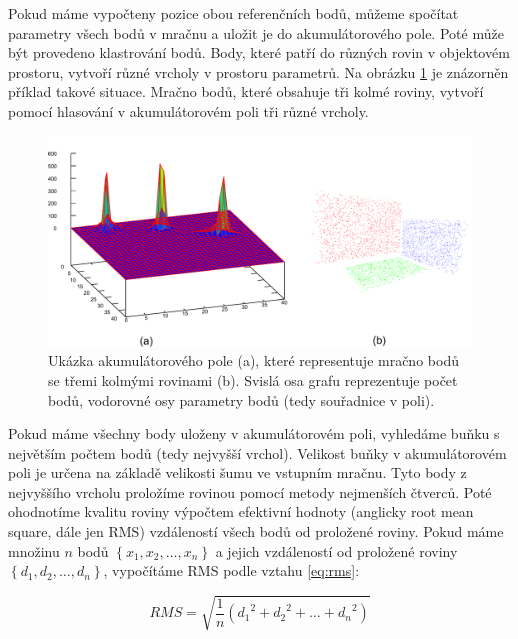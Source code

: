 \documentclass[11pt,twoside,a4paper]{book}
\begin{document}
Pokud máme vypočteny pozice obou referenčních bodů, můžeme spočítat parametry všech bodů v mračnu a uložit je do akumulátorového pole. Poté může být provedeno kla\-stro\-vá\-ní bodů. Body, které patří do různých rovin v objektovém prostoru, vytvoří různé vrcholy v prostoru parametrů. Na obrázku \ref{fig:acc-pole} je znázorněn příklad takové situace. Mračno bodů, které obsahuje tři kolmé roviny, vytvoří pomocí hlasování v akumulátorovém poli tři různé vrcholy.

\begin{figure}[ht]
\begin{center}
\includegraphics[width=\textwidth]{figures/ac-pole}
\caption{Ukázka akumulátorového pole (a), které representuje mračno bodů se třemi kolmými rovinami (b). Svislá osa grafu reprezentuje počet bodů, vodorovné osy parametry bodů (tedy souřadnice v poli).}
\label{fig:acc-pole}
\end{center}
\end{figure}

Pokud máme všechny body uloženy v akumulátorovém poli, vyhledáme buňku s největším počtem bodů (tedy nejvyšší vrchol). Velikost buňky v akumulátorovém poli je určena na základě velikosti šumu ve vstupním mračnu. Tyto body z nejvyššího vrcholu proložíme rovinou pomocí metody nejmenších čtverců. Poté ohodnotíme kvalitu roviny výpočtem efektivní hodnoty (anglicky root mean square, dále jen RMS) vzdáleností všech bodů od proložené roviny. Pokud máme množinu $n$ bodů $\left\{x_1, x_2, \ldots , x_n\right\}$ a jejich vzdáleností od proložené roviny $\left\{d_1, d_2, \ldots , d_n\right\}$, vypočítáme RMS podle vztahu \ref{eq:rms}:

\begin{equation} 
\label{eq:rms}
RMS = \sqrt{
\frac{1}{n}\left({d_1}^2 + {d_2}^2 + \ldots + {d_n}^2\right)
}
\end{equation}
\end{document}
